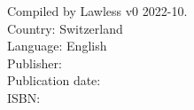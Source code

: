 \documentclass[openany]{book}
\begin{document}
\maketitle
\shipout\null

Compiled by Lawless v0 2022-10.\\
Country: Switzerland\\
Language: English\\
Publisher: \\
Publication date: \\
ISBN: 

\tableofcontents
\clearpage



\end{document}
